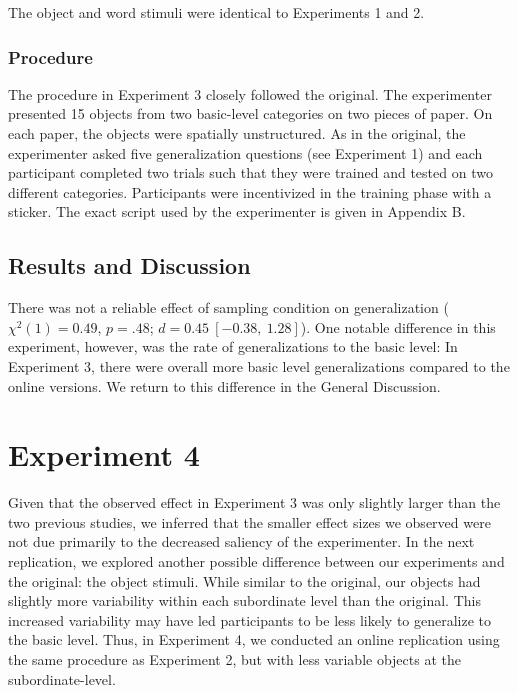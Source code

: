 \documentclass[man]{apa2}
\begin{document}
The object and word stimuli were identical to Experiments 1 and 2. 

\subsubsection{Procedure}

The procedure in Experiment 3 closely followed the original. The experimenter presented 15 objects from two basic-level categories on two pieces of paper. On each paper, the objects were spatially unstructured. As in the original, the experimenter asked five generalization questions (see Experiment 1) and each participant completed two trials such that they were trained and tested on two different categories. Participants were incentivized in the training phase with a sticker. The exact script used by the experimenter is given in Appendix B. 

\subsection{Results and Discussion}

There was not a reliable effect of sampling condition on generalization ($\chi^2(1) = 0.49$, $p = .48$; $d = 0.45\ [-0.38,\ 1.28]$). One notable difference in this experiment, however, was the rate of generalizations to the basic level: In Experiment 3, there were overall more basic level generalizations compared to the online versions. We return to this difference in the General Discussion.

\section{Experiment 4}

Given that the observed effect in Experiment 3 was only slightly larger than the two previous studies, we inferred that the smaller effect sizes we observed were not due primarily to the decreased saliency of the experimenter. In the next replication, we explored another possible difference between our experiments and the original: the object stimuli. While similar to the original, our objects had slightly more variability within each subordinate level than the original. This increased variability may have led participants to be less likely to generalize to the basic level. Thus, in Experiment 4, we conducted an online replication using the same procedure as Experiment 2, but with less variable objects at the subordinate-level. 
\end{document}
